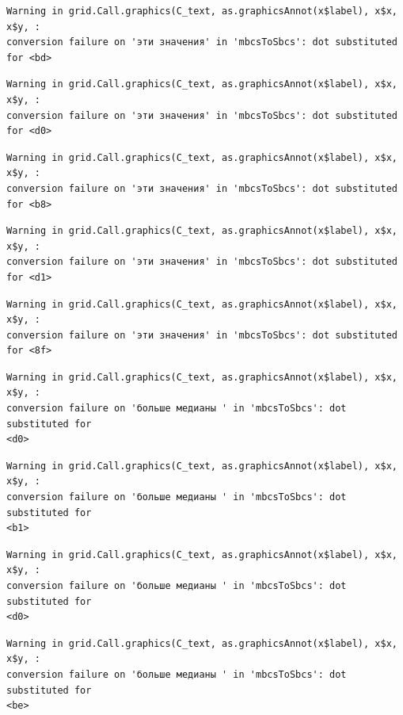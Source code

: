 \documentclass[
  letterpaper,
]{scrbook}
\theoremstyle{definition}
\theoremstyle{remark}
\begin{document}
\begin{verbatim}
Warning in grid.Call.graphics(C_text, as.graphicsAnnot(x$label), x$x, x$y, :
conversion failure on 'эти значения' in 'mbcsToSbcs': dot substituted for <bd>
\end{verbatim}

\begin{verbatim}
Warning in grid.Call.graphics(C_text, as.graphicsAnnot(x$label), x$x, x$y, :
conversion failure on 'эти значения' in 'mbcsToSbcs': dot substituted for <d0>
\end{verbatim}

\begin{verbatim}
Warning in grid.Call.graphics(C_text, as.graphicsAnnot(x$label), x$x, x$y, :
conversion failure on 'эти значения' in 'mbcsToSbcs': dot substituted for <b8>
\end{verbatim}

\begin{verbatim}
Warning in grid.Call.graphics(C_text, as.graphicsAnnot(x$label), x$x, x$y, :
conversion failure on 'эти значения' in 'mbcsToSbcs': dot substituted for <d1>
\end{verbatim}

\begin{verbatim}
Warning in grid.Call.graphics(C_text, as.graphicsAnnot(x$label), x$x, x$y, :
conversion failure on 'эти значения' in 'mbcsToSbcs': dot substituted for <8f>
\end{verbatim}

\begin{verbatim}
Warning in grid.Call.graphics(C_text, as.graphicsAnnot(x$label), x$x, x$y, :
conversion failure on 'больше медианы ' in 'mbcsToSbcs': dot substituted for
<d0>
\end{verbatim}

\begin{verbatim}
Warning in grid.Call.graphics(C_text, as.graphicsAnnot(x$label), x$x, x$y, :
conversion failure on 'больше медианы ' in 'mbcsToSbcs': dot substituted for
<b1>
\end{verbatim}

\begin{verbatim}
Warning in grid.Call.graphics(C_text, as.graphicsAnnot(x$label), x$x, x$y, :
conversion failure on 'больше медианы ' in 'mbcsToSbcs': dot substituted for
<d0>
\end{verbatim}

\begin{verbatim}
Warning in grid.Call.graphics(C_text, as.graphicsAnnot(x$label), x$x, x$y, :
conversion failure on 'больше медианы ' in 'mbcsToSbcs': dot substituted for
<be>
\end{verbatim}
\end{document}
